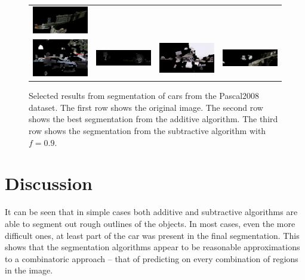 \documentclass[10pt,twocolumn,letterpaper]{article}
\begin{document}
\begin{figure}[p]
\begin{tabular}{ p{4cm} p{4cm} p{4cm} p{4cm} }
\includegraphics[width=3.95cm]{figures/results/a2008_007529.jpg.eps} \\
\includegraphics[width=3.95cm]{figures/results/b2008_002483.jpg.eps} &
\includegraphics[width=3.95cm]{figures/results/b2008_007466.jpg.eps} &
\includegraphics[width=3.95cm]{figures/results/b2008_005378.jpg.eps} &
\includegraphics[width=3.95cm]{figures/results/b2008_007529.jpg.eps} \\
\end{tabular}
\caption{Selected results from segmentation of cars from the Pascal2008 
dataset.  The first row shows the original image.  The second row shows
the best segmentation from the additive algorithm.  The third row shows
the segmentation from the subtractive algorithm with $f=0.9$.}
\label{fig:bad_results}
\end{figure}

\section{Discussion}
\label{sec:discussion}
It can be seen that in simple cases both additive and subtractive algorithms
are able to segment out rough outlines of the objects.  In most cases, even
the more difficult ones, at least part of the car was present in the final
segmentation.  This shows that the segmentation algorithms appear to be
reasonable approximations to a combinatoric approach -- that of predicting
on every combination of regions in the image.  
\end{document}
